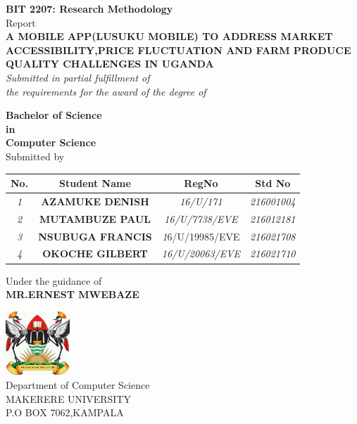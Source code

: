 \begin{titlepage}

\begin{center}

\textup{\small {\bf BIT 2207: Research Methodology } \\ Report}\\[0.2in]

\Large \textbf {A MOBILE APP(LUSUKU MOBILE) TO ADDRESS MARKET ACCESSIBILITY,PRICE FLUCTUATION AND FARM PRODUCE QUALITY CHALLENGES IN UGANDA }\\[0.5in]

       \small \emph{Submitted in partial fulfillment of\\
        the requirements for the award of the degree of}
        \vspace{.2in}

       {\bf Bachelor of Science \\in\\ Computer Science}\\[0.5in]





\normalsize Submitted by \\
\centering
\begin{tabular}{|c|c|c|c|}
\hline
\textbf{No.}& \textbf{Student Name} & \textbf{RegNo} & \textbf{Std No} \\ \hline
\textit{1}&\textbf{AZAMUKE DENISH} & \textit{16/U/171}& \textit{216001004} \\ \hline
\textit{2}&\textbf{MUTAMBUZE PAUL}& \textit{16/U/7738/EVE}& \textit{216012181} \\ \hline
\textit{3}&\textbf{NSUBUGA FRANCIS} & \textit16/U/19985/EVE & \textit{216021708} \\ \hline
\textit{4}&\textbf{OKOCHE GILBERT } & \textit{16/U/20063/EVE}  & \textit{216021710} \\ 
 \hline
\end{tabular}

\vspace{.1in}
Under the guidance of\\
{\textbf{MR.ERNEST MWEBAZE}}\\[0.2in]

\vfill

\includegraphics[width=0.18\textwidth]{./Muk_logo}\\[0.1in]
\Large{Department of Computer Science}\\
\normalsize
\textsc{MAKERERE UNIVERSITY}\\
P.O BOX 7062,KAMPALA \\
\vspace{0.2cm}


\end{center}

\end{titlepage}

